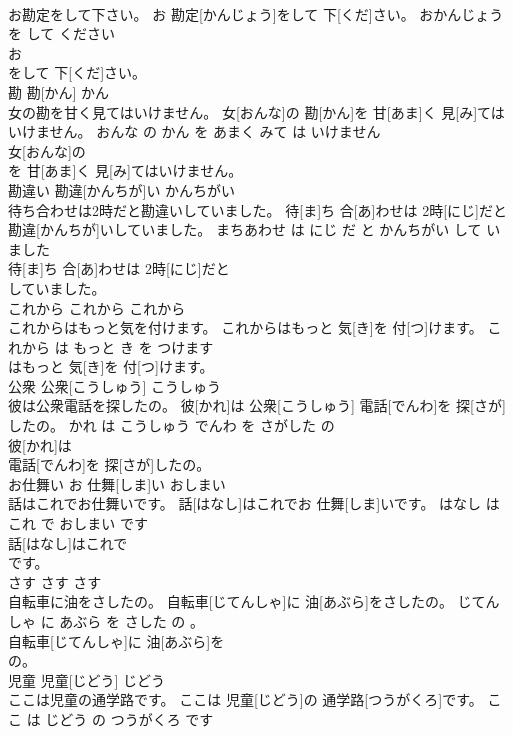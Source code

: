 \documentclass[8pt]{extreport}
\begin{document}
\begin{CJK}{UTF8}{min}
\\	お勘定をして下さい。	お 勘定[かんじょう]をして 下[くだ]さい。	おかんじょう を して ください	
\\	お
\\	をして 下[くだ]さい。			
\\	勘	勘[かん]	かん	
\\	女の勘を甘く見てはいけません。	女[おんな]の 勘[かん]を 甘[あま]く 見[み]てはいけません。	おんな の かん を あまく みて は いけません	
\\	女[おんな]の
\\	を 甘[あま]く 見[み]てはいけません。			
\\	勘違い	勘違[かんちが]い	かんちがい	
\\	待ち合わせは2時だと勘違いしていました。	待[ま]ち 合[あ]わせは 2時[にじ]だと 勘違[かんちが]いしていました。	まちあわせ は にじ だ と かんちがい して いました	
\\	待[ま]ち 合[あ]わせは 2時[にじ]だと
\\	していました。			
\\	これから	これから	これから	
\\	これからはもっと気を付けます。	これからはもっと 気[き]を 付[つ]けます。	これから は もっと き を つけます	
\\	はもっと 気[き]を 付[つ]けます。			
\\	公衆	公衆[こうしゅう]	こうしゅう	
\\	彼は公衆電話を探したの。	彼[かれ]は 公衆[こうしゅう] 電話[でんわ]を 探[さが]したの。	かれ は こうしゅう でんわ を さがした の	
\\	彼[かれ]は
\\	電話[でんわ]を 探[さが]したの。			
\\	お仕舞い	お 仕舞[しま]い	おしまい	
\\	話はこれでお仕舞いです。	話[はなし]はこれでお 仕舞[しま]いです。	はなし は これ で おしまい です	
\\	話[はなし]はこれで
\\	です。			
\\	さす	さす	さす	
\\	自転車に油をさしたの。	自転車[じてんしゃ]に 油[あぶら]をさしたの。	じてんしゃ に あぶら を さした の 。	
\\	自転車[じてんしゃ]に 油[あぶら]を
\\	の。			
\\	児童	児童[じどう]	じどう	
\\	ここは児童の通学路です。	ここは 児童[じどう]の 通学路[つうがくろ]です。	ここ は じどう の つうがくろ です	

\end{CJK}
\end{document}
